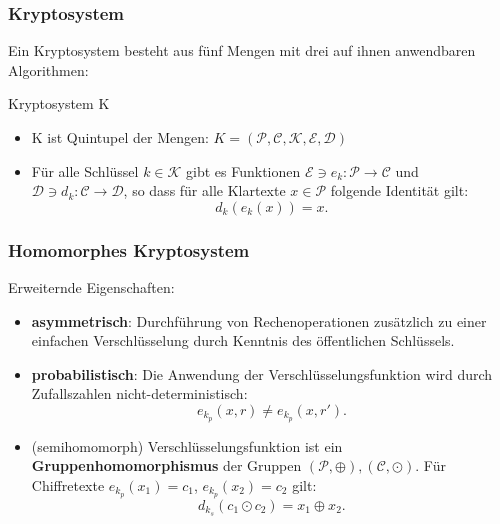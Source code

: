 \documentclass[handout,usenames,dvipsnames]{beamer}
\begin{document}
\begin{frame}
	\frametitle{Kryptosystem}
	Ein Kryptosystem besteht aus fünf Mengen mit drei auf ihnen anwendbaren Algorithmen:
	\begin{block}{Kryptosystem K}
		\begin{itemize}
			\item K ist Quintupel der Mengen: $K = (\mathcal{P},\mathcal{C},\mathcal{K},\mathcal{E},\mathcal{D})$
			\item Für alle Schlüssel $k\in \mathcal{K}$ gibt es Funktionen  $\mathcal{E}\ni e_k:\mathcal{P}\rightarrow\mathcal{C}$ und  $\mathcal{D}\ni d_k:\mathcal{C}\rightarrow\mathcal{D}$, so dass für alle Klartexte $x\in\mathcal{P}$ folgende Identität gilt: 
			\begin{equation*} d_k(e_k(x)) = x. \end{equation*}
		\end{itemize}
	\end{block}
\end{frame}

\begin{frame}
	\frametitle{Homomorphes Kryptosystem} 
	Erweiternde Eigenschaften:
	\begin{itemize}
		\item \textbf{asymmetrisch}: Durchführung von Rechenoperationen zusätzlich zu einer einfachen Verschlüsselung durch Kenntnis des öffentlichen Schlüssels.
		\item \textbf{probabilistisch}: Die Anwendung der Verschlüsselungsfunktion wird durch Zufallszahlen nicht-deterministisch:
		\begin{equation*} e_{k_p}(x,r) \neq e_{k_p}(x,r'). \end{equation*}
		\item (semihomomorph) Verschlüsselungsfunktion ist ein \textbf{Gruppenhomomorphismus} der Gruppen $(\mathcal{P},\oplus), (\mathcal{C},\odot)$. Für Chiffretexte  $e_{k_p}(x_1)=c_1$, $e_{k_p}(x_2)=c_2$ gilt:	
		\begin{equation*}   d_{k_s}(c_1\odot c_2)= x_1\oplus x_2.	\end{equation*}
	\end{itemize}
\end{frame}
\end{document}
